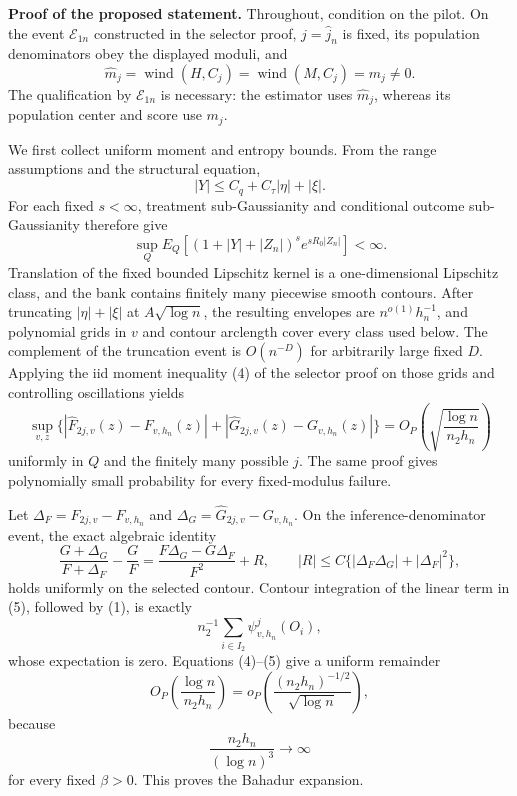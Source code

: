 \textbf{Proof of the proposed statement.}
Throughout, condition on the pilot.  On the event \(\mathcal E_{1n}\) constructed in the selector proof, \(j=\widehat j_n\) is fixed, its population denominators obey the displayed moduli, and
\[
 \widehat m_j=\operatorname{wind}(H,C_j)
 =\operatorname{wind}(M,C_j)=m_j\ne0. \tag{1}
\]
The qualification by \(\mathcal E_{1n}\) is necessary: the estimator uses \(\widehat m_j\), whereas its population center and score use \(m_j\).

We first collect uniform moment and entropy bounds.  From the range assumptions and the structural equation,
\[
 |Y|\le C_q+C_\tau|\eta|+|\xi|. \tag{2}
\]
For each fixed \(s<\infty\), treatment sub-Gaussianity and conditional outcome sub-Gaussianity therefore give
\[
 \sup_Q E_Q\left[(1+|Y|+|Z_n|)^s
 e^{sR_0|Z_n|}\right]<\infty. \tag{3}
\]
Translation of the fixed bounded Lipschitz kernel is a one-dimensional Lipschitz class, and the bank contains finitely many piecewise smooth contours.  After truncating \(|\eta|+|\xi|\) at \(A\sqrt{\log n}\), the resulting envelopes are \(n^{o(1)}h_n^{-1}\), and polynomial grids in \(v\) and contour arclength cover every class used below.  The complement of the truncation event is \(O(n^{-D})\) for arbitrarily large fixed \(D\).  Applying the iid moment inequality (4) of the selector proof on those grids and controlling oscillations yields
\[
 \sup_{v,z}\{|\widehat F_{2j,v}(z)-F_{v,h_n}(z)|
              +|\widehat G_{2j,v}(z)-G_{v,h_n}(z)|\}
 =O_P\!\left(\sqrt{\frac{\log n}{n_2h_n}}\right) \tag{4}
\]
uniformly in \(Q\) and the finitely many possible \(j\).  The same proof gives polynomially small probability for every fixed-modulus failure.

Let \(\Delta_F=\widehat F_{2j,v}-F_{v,h_n}\) and \(\Delta_G=\widehat G_{2j,v}-G_{v,h_n}\).  On the inference-denominator event, the exact algebraic identity
\[
 \frac{G+\Delta_G}{F+\Delta_F}-\frac GF
 =\frac{F\Delta_G-G\Delta_F}{F^2}+R,
 \qquad
 |R|\le C\{|\Delta_F\Delta_G|+|\Delta_F|^2\}, \tag{5}
\]
holds uniformly on the selected contour.  Contour integration of the linear term in (5), followed by (1), is exactly
\[
 n_2^{-1}\sum_{i\in I_2}\psi^j_{v,h_n}(O_i), \tag{6}
\]
whose expectation is zero.  Equations (4)--(5) give a uniform remainder
\[
 O_P\!\left(\frac{\log n}{n_2h_n}\right)
 =o_P\!\left(\frac{(n_2h_n)^{-1/2}}{\sqrt{\log n}}\right), \tag{7}
\]
because
\[
 \frac{n_2h_n}{(\log n)^3}\longrightarrow\infty \tag{8}
\]
for every fixed \(\beta>0\).  This proves the Bahadur expansion.

